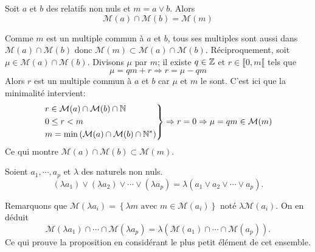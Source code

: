 \begin{propn}
Soit $a$ et $b$ des relatifs non nuls et $m = a \vee b$. Alors
\begin{displaymath}
\mathcal M(a)\cap \mathcal M(b)=\mathcal M(m)  
\end{displaymath}
\end{propn}
\begin{demo}
Comme $m$ est un multiple commun à $a$ et $b$, tous ses multiples sont aussi dans $\mathcal M(a)\cap \mathcal M(b)$ donc $\mathcal{M}(m) \subset \mathcal M(a)\cap \mathcal M(b)$.\newline
Réciproquement, soit $\mu \in \mathcal M(a)\cap \mathcal M(b)$. Divisons $\mu$ par $m$; il existe $q\in \mathbb{Z}$ et $r\in \llbracket 0 , m\llbracket$ tels que
\begin{displaymath}
\mu = qm + r \Rightarrow r = \mu - qm
\end{displaymath}
Alors $r$ est un multiple commun à $a$ et $b$ car $\mu$ et $m$ le sont. C'est ici que la minimalité intervient:
\begin{displaymath}
\left. 
\begin{aligned}
&r \in \mathcal M(a)\cap \mathcal M(b) \cap \mathbb{N}\\
&0 \leq r < m \\
&m = \min \left( \mathcal{M}(a)\cap \mathcal{M}(b) \cap \mathbb{N}^*\right)
\end{aligned}
\right\rbrace \Rightarrow r = 0 \Rightarrow \mu = qm \in \mathcal{M}(m)
\end{displaymath}
Ce qui montre $\mathcal M(a)\cap \mathcal M(b) \subset \mathcal{M}(m)$.
\end{demo}
\begin{propn}
  Soient $a_1, \cdots, a_p$ et $\lambda$ des naturels non nuls. 
\[
  (\lambda a_1)\vee (\lambda a_2)\vee \cdots \vee(\lambda a_p) = \lambda(a_1 \vee a_2 \vee \cdots \vee a_p). 
\]
\end{propn}
\begin{demo}
Remarquons que $\mathcal{M}(\lambda a_i) = \left\lbrace\lambda m \text{ avec } m \in \mathcal{M}(a_i)\right\rbrace$ noté $\lambda \mathcal{M}(a_i)$. On en déduit
\[
  \mathcal{M}(\lambda a_1)\cap \cdots \cap \mathcal{M}(\lambda a_p) = \lambda \left( \mathcal{M}(a_1) \cap \cdots \cap \mathcal{M}(a_p)\right).
\]
Ce qui prouve la proposition en considérant le plus petit élément de cet ensemble.

\end{demo}


